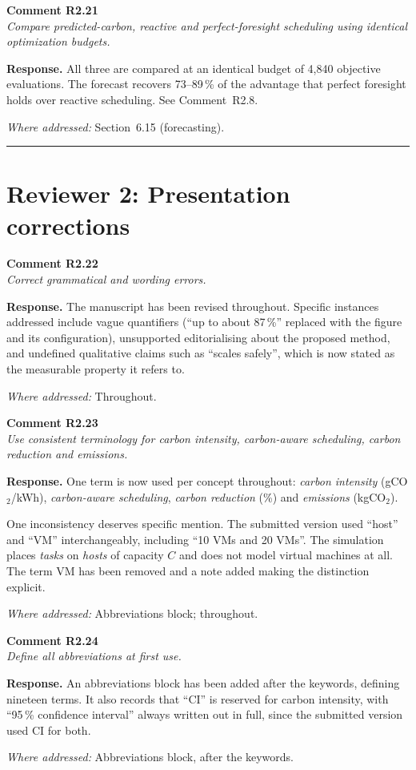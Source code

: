 \documentclass[11pt,a4paper]{article}
\newcommand{\rsp}[1]{\vspace{2pt}\noindent\textbf{Response.} #1\par\vspace{6pt}}
\newcommand{\rwhere}[1]{\noindent\textit{Where addressed:} #1\par\vspace{10pt}}
\newenvironment{revcomment}[1]
  {\begin{tcolorbox}[colback=gray!6,colframe=gray!45,boxrule=0.4pt,
     left=6pt,right=6pt,top=4pt,bottom=4pt]\textbf{#1}\\[2pt]\itshape\color{cmt}}
  {\end{tcolorbox}\vspace{4pt}}
\begin{document}
\begin{revcomment}{Comment R2.21}
Compare predicted-carbon, reactive and perfect-foresight scheduling using identical
optimization budgets.
\end{revcomment}
\rsp{All three are compared at an identical budget of 4{,}840 objective evaluations.
The forecast recovers 73--89\,\% of the advantage that perfect foresight holds over
reactive scheduling. See Comment~R2.8.}
\rwhere{Section~6.15 (forecasting).}

\bigskip
\hrule
\bigskip

\section{Reviewer 2: Presentation corrections}

\begin{revcomment}{Comment R2.22}
Correct grammatical and wording errors.
\end{revcomment}
\rsp{The manuscript has been revised throughout. Specific instances addressed
include vague quantifiers (``up to about 87\,\%'' replaced with the figure and its
configuration), unsupported editorialising about the proposed method, and undefined
qualitative claims such as ``scales safely'', which is now stated as the
measurable property it refers to.}
\rwhere{Throughout.}

\begin{revcomment}{Comment R2.23}
Use consistent terminology for carbon intensity, carbon-aware scheduling, carbon
reduction and emissions.
\end{revcomment}
\rsp{One term is now used per concept throughout: \emph{carbon intensity}
(gCO$_2$/kWh), \emph{carbon-aware scheduling}, \emph{carbon reduction} (\%) and
\emph{emissions} (kgCO$_2$).

One inconsistency deserves specific mention. The submitted version used ``host''
and ``VM'' interchangeably, including ``10 VMs and 20 VMs''. The simulation places
\emph{tasks} on \emph{hosts} of capacity $C$ and does not model virtual machines at
all. The term VM has been removed and a note added making the distinction
explicit.}
\rwhere{Abbreviations block; throughout.}

\begin{revcomment}{Comment R2.24}
Define all abbreviations at first use.
\end{revcomment}
\rsp{An abbreviations block has been added after the keywords, defining nineteen
terms. It also records that ``CI'' is reserved for carbon intensity, with
``95\,\% confidence interval'' always written out in full, since the submitted
version used CI for both.}
\rwhere{Abbreviations block, after the keywords.}
\end{document}
